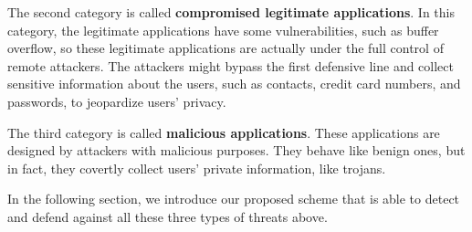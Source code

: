 The second category is called \textbf{compromised legitimate applications}. In
this category, the legitimate applications have some vulnerabilities, such as
buffer overflow, so these legitimate applications are actually under the full
control of remote attackers. The attackers might bypass the first defensive line
and collect sensitive information about the users, such as contacts, credit card
numbers, and passwords, to jeopardize users’ privacy.

The third category is called \textbf{malicious applications}. These applications
are designed by attackers with malicious purposes. They behave like benign ones,
but in fact, they covertly collect users’ private information, like trojans.

In the following section, we introduce our proposed scheme that is able to
detect and defend against all these three types of threats above.